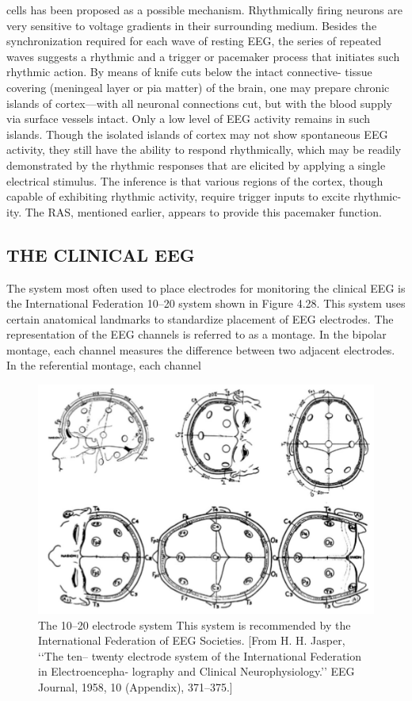 cells has been proposed as a possible mechanism. Rhythmically firing neurons are
very sensitive to voltage gradients in their surrounding medium.
Besides the synchronization required for each wave of resting EEG, the series
of repeated waves suggests a rhythmic and a trigger or pacemaker process that
initiates such rhythmic action. By means of knife cuts below the intact connective-
tissue covering (meningeal layer or pia matter) of the brain, one may prepare
chronic islands of cortex—with all neuronal connections cut, but with the blood
supply via surface vessels intact. Only a low level of EEG activity remains in such
islands. Though the isolated islands of cortex may not show spontaneous EEG
activity, they still have the ability to respond rhythmically, which may be readily
demonstrated by the rhythmic responses that are elicited by applying a single
electrical stimulus. The inference is that various regions of the cortex, though
capable of exhibiting rhythmic activity, require trigger inputs to excite rhythmic-
ity. The RAS, mentioned earlier, appears to provide this pacemaker function.

\subsection{THE CLINICAL EEG}

The system most often used to place electrodes for monitoring the clinical
EEG is the International Federation 10–20 system shown in Figure 4.28. This
system uses certain anatomical landmarks to standardize placement of EEG
electrodes. The representation of the EEG channels is referred to as a
montage. In the bipolar montage, each channel measures the difference
between two adjacent electrodes. In the referential montage, each channel

\begin{figure}
\centering
\includegraphics[width=0.7\linewidth]{figura_6.png} 
\caption{The 10–20 electrode system This system is recommended by the
International Federation of EEG Societies. [From H. H. Jasper, ‘‘The ten–
twenty electrode system of the International Federation in Electroencepha-
lography and Clinical Neurophysiology.’’ EEG Journal, 1958, 10 (Appendix),
371–375.]}
\end{figure}

